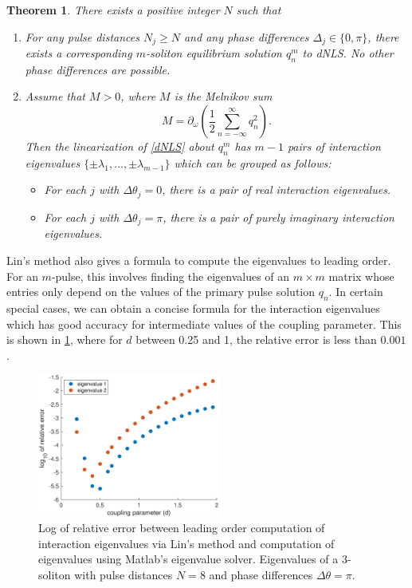 \documentclass[12pt,reqno]{amsart}
\newtheorem{theorem}{Theorem}
\theoremstyle{definition}
\theoremstyle{remark}
\begin{document}
\begin{theorem}\label{dNLSeigtheorem}
There exists a positive integer $N$ such that
\begin{enumerate}
\item For any pulse distances $N_j \geq N$ and any phase differences $\Delta_j \in \{0, \pi\}$, there exists a corresponding $m$-soliton equilibrium solution $q_n^m$ to dNLS. No other phase differences are possible.
\item Assume that $M > 0$, where $M$ is the Melnikov sum
\[
M = \partial_\omega \left( \frac{1}{2} \sum_{n=-\infty}^\infty q_n^2 \right).
\]
Then the linearization of \eqref{dNLS} about $q_n^m$ has $m-1$ pairs of interaction eigenvalues $\{\pm \lambda_1, \dots, \pm \lambda_{m-1}\}$ which can be grouped as follows:
\begin{itemize}
\item For each $j$ with $\Delta\theta_j = 0$, there is a pair of real interaction eigenvalues.
\item For each $j$ with $\Delta\theta_j = \pi$, there is a pair of purely imaginary interaction eigenvalues.
\end{itemize} 
\end{enumerate}
\end{theorem}

Lin's method also gives a formula to compute the eigenvalues to leading order. For an $m$-pulse, this involves finding the eigenvalues of an $m\times m$ matrix whose entries only depend on the values of the primary pulse solution $q_n$. In certain special cases, we can obtain a concise formula for the interaction eigenvalues which has good accuracy for intermediate values of the coupling parameter. This is shown in \cref{fig:dNLS3pulseerrors}, where for $d$ between 0.25 and 1, the relative error is less than $0.001$.

\begin{figure}[ht]
\centering
\includegraphics[width=6cm]{dNLS3pulseerrors}
\caption{Log of relative error between leading order computation of interaction eigenvalues via Lin's method and computation of eigenvalues using Matlab's eigenvalue solver. Eigenvalues of a 3-soliton with pulse distances $N = 8$ and phase differences $\Delta \theta = \pi$.} 
\label{fig:dNLS3pulseerrors}
\end{figure}



\end{document}
